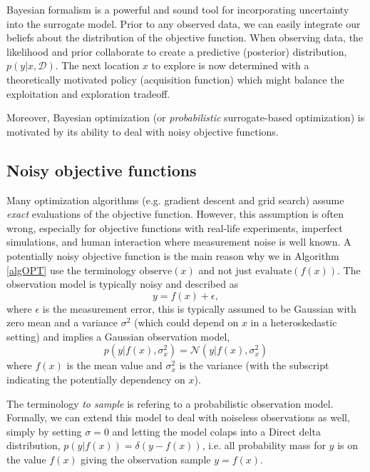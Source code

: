 Bayesian formalism is a powerful and sound tool for incorporating uncertainty into the surrogate
model. Prior to any observed data, we can easily integrate our beliefs about the distribution of
the objective function. When observing data, the likelihood and prior collaborate to create a
predictive (posterior) distribution, $p(y|x,\mathcal{D})$. The next location $x$ to explore is now
determined with a theoretically motivated policy (acquisition function) which might balance the
exploitation and exploration tradeoff. 

Moreover, Bayesian optimization (or \textit{probabilistic} surrogate-based optimization) is motivated by
its ability to deal with noisy objective functions. 


\subsection{Noisy objective functions}
Many optimization algorithms (e.g. gradient descent and grid search) assume \textit{exact}
evaluations of the objective function. However, this assumption is often wrong, especially for
objective functions with real-life experiments, imperfect simulations, and human interaction where
measurement noise is well known. A potentially noisy objective function is the main reason why we in
Algorithm \eqref{algOPT} use the terminology $\text{observe}(x)$ and not just
$\text{evaluate}(f(x))$. The observation model is typically noisy and described as
$$y = f(x)+\epsilon,$$ where $\epsilon$ is the measurement error, this is
typically assumed to be Gaussian with zero mean and a variance
$\sigma^2$ (which could depend on $x$ in a heteroskedastic setting) and implies a Gaussian observation model, 
$$p(y|f(x),\sigma_x^2) = \mathcal{N}(y|f(x),\sigma_x^2)$$ where $f(x)$ is the mean value and
$\sigma_x^2$ is the variance (with the subscript indicating the potentially dependency on $x$). 
\begin{note2}
    The terminology \textit{to sample} is refering to a probabilistic observation model. Formally, we
    can extend this model to deal with noiseless observations as well, simply by setting
    $\sigma = 0$ and letting the model colaps into a Direct delta distribution, $p(y|f(x)) =
    \mathcal{\delta}(y-f(x))$, i.e. all probability mass for $y$ is on the value $f(x)$ giving the
    observation sample $y = f(x)$. 
\end{note2}

